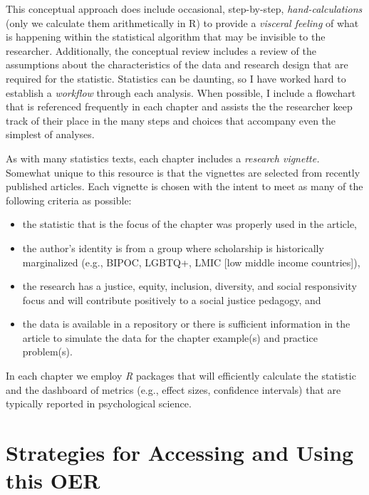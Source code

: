 \documentclass[
  english,
]{book}
\providecommand{\tightlist}{%
  \setlength{\itemsep}{0pt}\setlength{\parskip}{0pt}}
\begin{document}
This conceptual approach does include occasional, step-by-step, \emph{hand-calculations} (only we calculate them arithmetically in R) to provide a \emph{visceral feeling} of what is happening within the statistical algorithm that may be invisible to the researcher. Additionally, the conceptual review includes a review of the assumptions about the characteristics of the data and research design that are required for the statistic. Statistics can be daunting, so I have worked hard to establish a \emph{workflow} through each analysis. When possible, I include a flowchart that is referenced frequently in each chapter and assists the the researcher keep track of their place in the many steps and choices that accompany even the simplest of analyses.

As with many statistics texts, each chapter includes a \emph{research vignette.} Somewhat unique to this resource is that the vignettes are selected from recently published articles. Each vignette is chosen with the intent to meet as many of the following criteria as possible:

\begin{itemize}
\tightlist
\item
  the statistic that is the focus of the chapter was properly used in the article,
\item
  the author's identity is from a group where scholarship is historically marginalized (e.g., BIPOC, LGBTQ+, LMIC {[}low middle income countries{]}),
\item
  the research has a justice, equity, inclusion, diversity, and social responsivity focus and will contribute positively to a social justice pedagogy, and
\item
  the data is available in a repository or there is sufficient information in the article to simulate the data for the chapter example(s) and practice problem(s).
\end{itemize}

In each chapter we employ \emph{R} packages that will efficiently calculate the statistic and the dashboard of metrics (e.g., effect sizes, confidence intervals) that are typically reported in psychological science.

\hypertarget{strategies-for-accessing-and-using-this-oer}{%
\section{Strategies for Accessing and Using this OER}\label{strategies-for-accessing-and-using-this-oer}}
\end{document}
